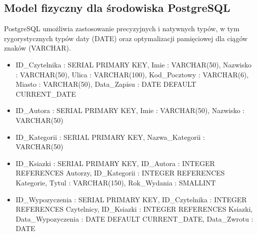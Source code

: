 \documentclass[letterpaper,10pt,english]{sphinxmanual}
\begin{document}
\noindent{}


\subsection{Model fizyczny dla środowiska PostgreSQL}
\label{\detokenize{rozdzial_3/index:model-fizyczny-dla-srodowiska-postgresql}}
\sphinxAtStartPar
PostgreSQL umożliwia zastosowanie precyzyjnych i natywnych typów, w tym rygorystycznych typów daty (DATE) oraz optymalizacji pamięciowej dla ciągów znaków (VARCHAR).
\begin{itemize}
\item {} 
\sphinxAtStartPar
{} ID\_Czytelnika : SERIAL PRIMARY KEY, Imie : VARCHAR(50), Nazwisko : VARCHAR(50), Ulica : VARCHAR(100), Kod\_Pocztowy : VARCHAR(6), Miasto : VARCHAR(50), Data\_Zapisu : DATE DEFAULT CURRENT\_DATE

\item {} 
\sphinxAtStartPar
{} ID\_Autora : SERIAL PRIMARY KEY, Imie : VARCHAR(50), Nazwisko : VARCHAR(50)

\item {} 
\sphinxAtStartPar
{} ID\_Kategorii : SERIAL PRIMARY KEY, Nazwa\_Kategorii : VARCHAR(50)

\item {} 
\sphinxAtStartPar
{} ID\_Ksiazki : SERIAL PRIMARY KEY, ID\_Autora : INTEGER REFERENCES Autorzy, ID\_Kategorii : INTEGER REFERENCES Kategorie, Tytul : VARCHAR(150), Rok\_Wydania : SMALLINT

\item {} 
\sphinxAtStartPar
{} ID\_Wypozyczenia : SERIAL PRIMARY KEY, ID\_Czytelnika : INTEGER REFERENCES Czytelnicy, ID\_Ksiazki : INTEGER REFERENCES Ksiazki, Data\_Wypozyczenia : DATE DEFAULT CURRENT\_DATE, Data\_Zwrotu : DATE

\end{itemize}

\noindent{}

\sphinxstepscope
\end{document}
